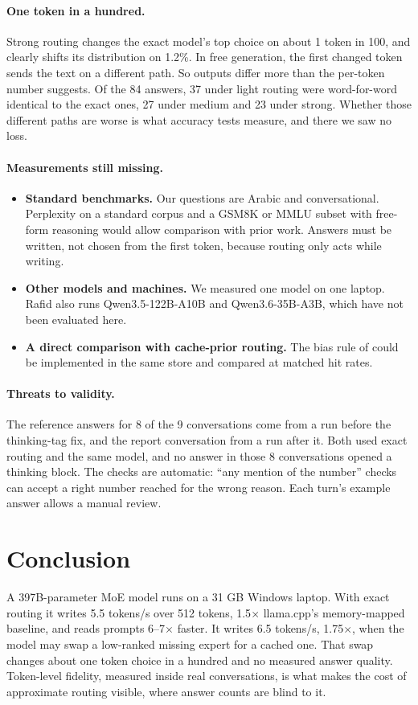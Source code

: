 \paragraph{One token in a hundred.} Strong routing changes the exact model's top choice on about 1 token in 100, and clearly shifts its distribution on 1.2\%. In free generation, the first changed token sends the text on a different path. So outputs differ more than the per-token number suggests. Of the 84 answers, 37 under light routing were word-for-word identical to the exact ones, 27 under medium and 23 under strong. Whether those different paths are worse is what accuracy tests measure, and there we saw no loss.

\paragraph{Measurements still missing.}
\begin{itemize}
  \item \textbf{Standard benchmarks.} Our questions are Arabic and conversational. Perplexity on a standard corpus and a GSM8K or MMLU subset with free-form reasoning would allow comparison with prior work. Answers must be written, not chosen from the first token, because routing only acts while writing.
  \item \textbf{Other models and machines.} We measured one model on one laptop. Rafid also runs Qwen3.5-122B-A10B and Qwen3.6-35B-A3B, which have not been evaluated here.
  \item \textbf{A direct comparison with cache-prior routing.} The bias rule of \citet{skliar2024} could be implemented in the same store and compared at matched hit rates.
\end{itemize}

\paragraph{Threats to validity.} The reference answers for 8 of the 9 conversations come from a run before the thinking-tag fix, and the report conversation from a run after it. Both used exact routing and the same model, and no answer in those 8 conversations opened a thinking block. The checks are automatic: ``any mention of the number'' checks can accept a right number reached for the wrong reason. Each turn's example answer allows a manual review.

\section{Conclusion}
A 397B-parameter MoE model runs on a 31 GB Windows laptop. With exact routing it writes 5.5 tokens/s over 512 tokens, 1.5$\times$ llama.cpp's memory-mapped baseline, and reads prompts 6--7$\times$ faster. It writes 6.5 tokens/s, 1.75$\times$, when the model may swap a low-ranked missing expert for a cached one. That swap changes about one token choice in a hundred and no measured answer quality. Token-level fidelity, measured inside real conversations, is what makes the cost of approximate routing visible, where answer counts are blind to it.

